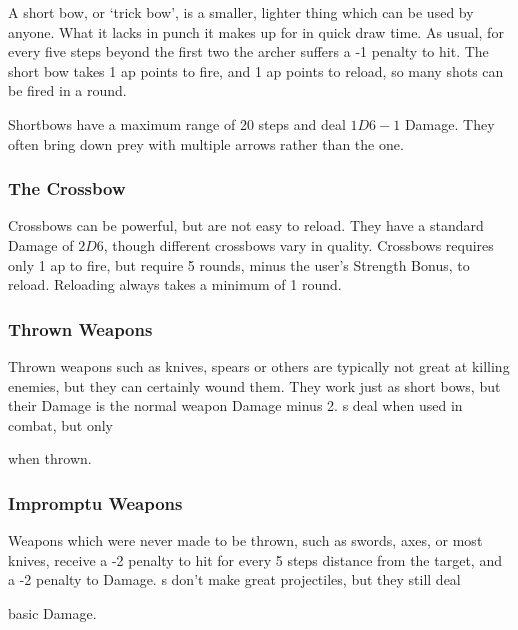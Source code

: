 \begin{multicols}{2}
A short bow, or `trick bow', is a smaller, lighter thing which can be used by anyone.
What it lacks in punch it makes up for in quick draw time.
As usual, for every five steps beyond the first two the archer suffers a -1 penalty to hit.
The short bow takes 1 \gls{ap} points to fire, and 1 \gls{ap} points to reload, so many shots can be fired in a \gls{round}.

Shortbows have a maximum range of 20 steps and deal $1D6-1$ Damage.
They often bring down prey with multiple arrows rather than the one.

\subsubsection{The Crossbow}
\label{crossbow}
Crossbows can be powerful, but are not easy to reload.
They have a standard Damage of $2D6$, though different crossbows vary in quality.
Crossbows requires only 1 \gls{ap} to fire, but require 5 rounds, minus the user's Strength Bonus, to reload.
Reloading always takes a minimum of 1 round.

\subsubsection{Thrown Weapons}

Thrown weapons such as knives, spears or others are typically not great at killing enemies, but they can certainly wound them.
They work just as short bows, but their Damage is the normal weapon Damage minus 2.
\javelin s deal  when used in combat, but only
\addtocounter{damage}{-2}%
 when thrown.

\subsubsection{Impromptu Weapons}

Weapons which were never made to be thrown, such as swords, axes, or most knives, receive a -2 penalty to hit for every 5 steps distance from the target, and a -2 penalty to Damage.
\longsword s don't make great projectiles, but they still deal
\addtocounter{damage}{-2}%
 basic Damage.

\end{multicols}

\startcontents[Manoeuvres]

